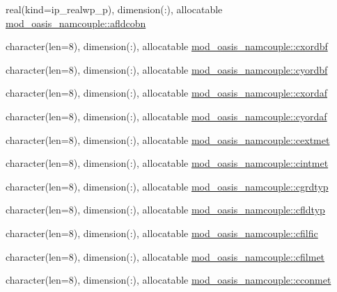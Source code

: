 \begin{DoxyCompactItemize}
\item 
real(kind=ip\+\_\+realwp\+\_\+p), dimension(\+:), allocatable \hyperlink{namespacemod__oasis__namcouple_a207709166cd4d719d65d76e6c043fd6c}{mod\+\_\+oasis\+\_\+namcouple\+::afldcobn}
\item 
character(len=8), dimension(\+:), allocatable \hyperlink{namespacemod__oasis__namcouple_a2ee5f8ec71ebae64c3d14445345d7545}{mod\+\_\+oasis\+\_\+namcouple\+::cxordbf}
\item 
character(len=8), dimension(\+:), allocatable \hyperlink{namespacemod__oasis__namcouple_ae1debe43f1c5cffeeb1d0d9ab563f4c4}{mod\+\_\+oasis\+\_\+namcouple\+::cyordbf}
\item 
character(len=8), dimension(\+:), allocatable \hyperlink{namespacemod__oasis__namcouple_ab52bc27bf5898cc85dce0fc60feb9320}{mod\+\_\+oasis\+\_\+namcouple\+::cxordaf}
\item 
character(len=8), dimension(\+:), allocatable \hyperlink{namespacemod__oasis__namcouple_a68de802180c51365e7d4bcc5180ac93b}{mod\+\_\+oasis\+\_\+namcouple\+::cyordaf}
\item 
character(len=8), dimension(\+:), allocatable \hyperlink{namespacemod__oasis__namcouple_a1066d92e6c9301bdb46ddda7edd7d29a}{mod\+\_\+oasis\+\_\+namcouple\+::cextmet}
\item 
character(len=8), dimension(\+:), allocatable \hyperlink{namespacemod__oasis__namcouple_ac9b9bb442cf77881bef2157c85e23495}{mod\+\_\+oasis\+\_\+namcouple\+::cintmet}
\item 
character(len=8), dimension(\+:), allocatable \hyperlink{namespacemod__oasis__namcouple_a795db0909c85ffadb601b744b5189ff5}{mod\+\_\+oasis\+\_\+namcouple\+::cgrdtyp}
\item 
character(len=8), dimension(\+:), allocatable \hyperlink{namespacemod__oasis__namcouple_ab139e7bad0413c79a5ad8e0837d3e0ef}{mod\+\_\+oasis\+\_\+namcouple\+::cfldtyp}
\item 
character(len=8), dimension(\+:), allocatable \hyperlink{namespacemod__oasis__namcouple_a6a69d927924d3fa391fdc3ec6cb78197}{mod\+\_\+oasis\+\_\+namcouple\+::cfilfic}
\item 
character(len=8), dimension(\+:), allocatable \hyperlink{namespacemod__oasis__namcouple_adf402f22f61893178fadcefe43b91102}{mod\+\_\+oasis\+\_\+namcouple\+::cfilmet}
\item 
character(len=8), dimension(\+:), allocatable \hyperlink{namespacemod__oasis__namcouple_a535fadd17426c228698e3a51fd54b605}{mod\+\_\+oasis\+\_\+namcouple\+::cconmet}
\item 

\end{DoxyCompactItemize}
